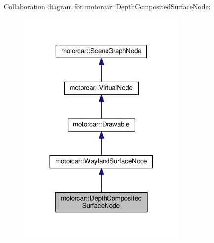 Collaboration diagram for motorcar\-:\-:Depth\-Composited\-Surface\-Node\-:
\nopagebreak
\begin{figure}[H]
\begin{center}
\leavevmode
\includegraphics[width=236pt]{classmotorcar_1_1DepthCompositedSurfaceNode__coll__graph}
\end{center}
\end{figure}
